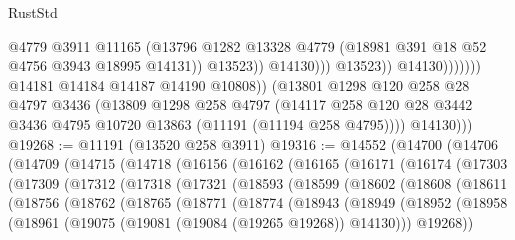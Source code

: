 \begin{lexlean}{RustStd}
\begin{coremodule}
                                        @4779
                                        @3911
                                        @11165
                                        (@13796
                                          @1282
                                          @13328
                                          @4779
                                          (@18981 @391 @18 @52 @4756 @3943 @18995 @14131))
                                        @13523))
                                    @14130)))
                              @13523))
                          @14130)))))))
            @14181
            @14184
            @14187
            @14190
            @10808))
        (@13801
          @1298
          @120
          @258
          @28
          @4797
          @3436
          (@13809
            @1298
            @258
            @4797
            (@14117 @258 @120 @28 @3442 @3436 @4795 @10720 @13863 (@11191 (@11194 @258 @4795))))
          @14130)))
@19268 := @11191 (@13520 @258 @3911)
@19316 := @14552
    (@14700
      (@14706
        (@14709
          (@14715
            (@14718
              (@16156
                (@16162
                  (@16165
                    (@16171
                      (@16174
                        (@17303
                          (@17309
                            (@17312
                              (@17318
                                (@17321
                                  (@18593
                                    (@18599
                                      (@18602
                                        (@18608
                                          (@18611
                                            (@18756
                                              (@18762
                                                (@18765
                                                  (@18771
                                                    (@18774
                                                      (@18943
                                                        (@18949
                                                          (@18952
                                                            (@18958
                                                              (@18961
                                                                (@19075
                                                                  (@19081
                                                                    (@19084 (@19265 @19268))
                                                                    @14130)))
                                                              @19268))

\end{coremodule}
\end{lexlean}
